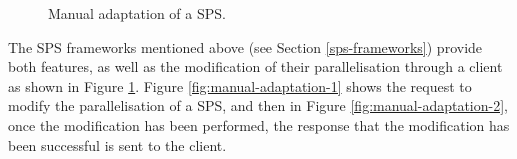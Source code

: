 \begin{figure}[!ht]
\begin{center}
 \hspace*{1.5cm}
\caption{Manual adaptation of a SPS.}
\label{fig:manual-adaptation}
\end{center}
\end{figure}

The SPS frameworks mentioned above (see Section \ref{sps-frameworks}) provide both features, as well as the modification of their parallelisation through a client as shown in Figure \ref{fig:manual-adaptation}. Figure \ref{fig:manual-adaptation-1} shows the request to modify the parallelisation of a SPS, and then in Figure \ref{fig:manual-adaptation-2}, once the modification has been performed, the response that the modification has been successful is sent to the client.

